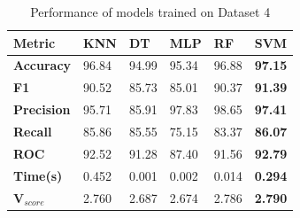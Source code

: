 \begin{table}[H]
  \centering
  \caption{Performance of models trained on Dataset 4}\label{tab:performance_of_models_trained_on_dataset_4}
  \begin{tabular}{|p{5em}|C{3em}|C{3em}|C{3em}|C{3em}|C{3em}|}
    \hline
    \textbf{Metric}      & \textbf{KNN} & \textbf{DT} & \textbf{MLP} & \textbf{RF} & \textbf{SVM}   \\
    \hline
    \textbf{Accuracy}    & 96.84        & 94.99       & 95.34        & 96.88       & \textbf{97.15} \\
    \textbf{F1}          & 90.52        & 85.73       & 85.01        & 90.37       & \textbf{91.39} \\
    \textbf{Precision}   & 95.71        & 85.91       & 97.83        & 98.65       & \textbf{97.41} \\
    \textbf{Recall}      & 85.86        & 85.55       & 75.15        & 83.37       & \textbf{86.07} \\
    \textbf{ROC}         & 92.52        & 91.28       & 87.40        & 91.56       & \textbf{92.79} \\
    \textbf{Time(s)}     & 0.452        & 0.001       & 0.002        & 0.014       & \textbf{0.294} \\
    \textbf{V$_{score}$} & 2.760        & 2.687       & 2.674        & 2.786       & \textbf{2.790} \\
    \hline
  \end{tabular}
\end{table}

